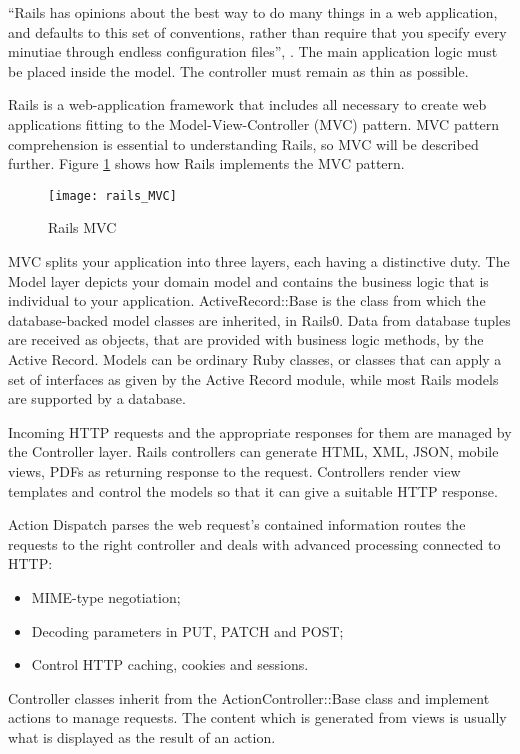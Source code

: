 ``Rails has opinions about the best way to do many things in a web application, and defaults to this set of conventions, rather than require that you specify every minutiae through endless configuration files'', \cite{rails_principles}. The main application logic must be placed inside the model. The controller must remain as thin as possible. 

Rails is a web-application framework that includes all necessary to create web applications fitting to the Model-View-Controller (MVC) pattern. MVC pattern comprehension is essential to understanding Rails, so MVC will be described further. Figure \ref{rails_mvc} shows how Rails implements the MVC pattern. 

\begin{figure}[!ht]
\centering
\texttt{[image: rails\_MVC]}
\caption{Rails MVC}\label{rails_mvc}
\end{figure}

MVC splits your application into three layers, each having a distinctive duty.
The Model layer depicts your domain model and contains the business logic that is individual to your application. ActiveRecord::Base is the class from which the database-backed model classes are inherited, in Rails0. Data from database tuples are received as objects, that are provided with business logic methods, by the Active Record. Models can be ordinary Ruby classes, or classes that can apply a set of interfaces as given by the Active Record module, while most Rails models are supported by a database.

Incoming HTTP requests and the appropriate responses for them are managed by the Controller layer.
Rails controllers can generate HTML, XML, JSON, mobile views, PDFs as returning response to the request. Controllers render view templates and control the models so that it can give a suitable HTTP response. 

Action Dispatch parses the web request's contained information routes the requests to the right controller and deals with advanced processing connected to HTTP:
\begin{itemize}
  \item MIME-type negotiation;
  \item Decoding parameters in PUT, PATCH and POST;
  \item Control HTTP caching, cookies and sessions.
\end{itemize}

Controller classes inherit from the ActionController::Base class and implement actions to manage requests. The content which is generated from views is usually what is displayed as the result of an action. 

